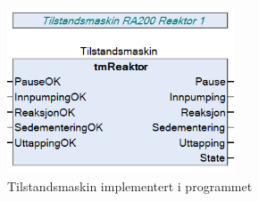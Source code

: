 \begin{figure}[htbp]
    \centering
    \includegraphics[width=0.6\textwidth]{Bilder/Tilstandsmaskin.png}
    \caption{Tilstandsmaskin implementert i programmet}\label{fig:TilstandsmaskinIProgram}
\end{figure}


